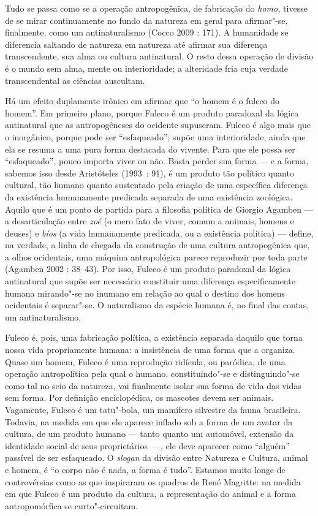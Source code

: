 Tudo se passa como se a operação antropogênica, de fabricação do
\emph{homo, }tivesse de se mirar continuamente no fundo da natureza em
geral para afirmar"-se, finalmente, como um antinaturalismo (Cocco 2009 :
171). A humanidade se diferencia saltando de natureza em natureza até
afirmar sua diferença transcendente, sua alma ou cultura antinatural. O
resto dessa operação de divisão é o mundo sem alma, mente ou
interioridade; a alteridade fria cuja verdade transcendental as ciências
auscultam.

Há um efeito duplamente irônico em afirmar que ``o homem é o fuleco do
homem''. Em primeiro plano, porque Fuleco é um produto paradoxal da
lógica antinatural que as antropogêneses do ocidente supuseram. Fuleco é
algo mais que o inorgânico, porque pode ser ``esfaqueado''; supõe uma
interioridade, ainda que ela se resuma a uma pura forma destacada do
vivente. Para que ele possa ser ``esfaqueado'', pouco importa viver ou
não. Basta perder sua forma --- e a forma, sabemos isso desde Aristóteles
(1993~: 91), é um produto tão político quanto cultural, tão humano
quanto sustentado pela criação de uma específica diferença da existência
humanamente predicada separada de uma existência zoológica. Aquilo que é
um ponto de partida para a filosofia política de Giorgio Agamben --- a
desarticulação entre \emph{zoé }(o mero fato de viver, comum a animais,
homens e deuses) e \emph{bíos} (a vida humanamente predicada, ou a
existência política) --- define, na verdade, a linha de chegada da
construção de uma cultura antropogênica que, a olhos ocidentais, uma
máquina antropológica parece reproduzir por toda parte (Agamben 2002 :
38--43). Por isso, Fuleco é um produto paradoxal da lógica antinatural
que supõe ser necessário constituir uma diferença especificamente humana
mirando"-se no inumano em relação ao qual o destino dos homens ocidentais
é separar"-se. O naturalismo da espécie humana é, no final das contas, um
antinaturalismo.

Fuleco é, pois, uma fabricação política, a existência separada daquilo
que torna nossa vida propriamente humana: a insistência de uma forma que
a organiza. Quase um homem, Fuleco é uma reprodução ridícula, ou
paródica, de uma operação antropolítica pela qual o humano,
constituindo"-se e distinguindo"-se como tal no seio da natureza, vai
finalmente isolar sua forma de vida das vidas sem forma. Por definição
enciclopédica, os mascotes devem ser animais. Vagamente, Fuleco é um
tatu"-bola, um mamífero silvestre da fauna brasileira. Todavia, na medida
em que ele aparece inflado sob a forma de um avatar da cultura, de um
produto humano --- tanto quanto um automóvel, extensão da identidade
social de seus proprietários~---, ele deve aparecer como ``alguém''
passível de ser esfaqueado. O \emph{slogan} da divisão entre Natureza e
Cultura, animal e homem, é ``o corpo não é nada, a forma é tudo''.
Estamos muito longe de controvérsias como as que inspiraram os quadros
de René Magritte: na medida em que Fuleco é um produto da
cultura, a representação do animal e a forma antropomórfica se
curto"-circuitam.

